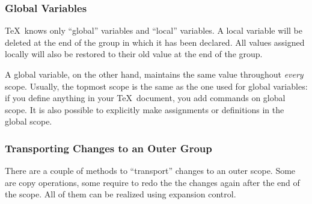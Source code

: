 \subsubsection{Global Variables}
\TeX\ knows only ``global'' variables and ``local'' variables. A local variable will be deleted at the end of the group in which it has been declared. All values assigned locally will also be restored to their old value at the end of the group.

A global variable, on the other hand, maintains the same value throughout \emph{every} scope. Usually, the topmost scope is the same as the one used for global variables: if you define anything in your \TeX\ document, you add commands on global scope. It is also possible to explicitly make assignments or definitions in the global scope.




\subsubsection{Transporting Changes to an Outer Group}
There are a couple of methods to ``transport'' changes to an outer scope. Some are copy operations, some require to redo the the changes again after the end of the scope. All of them can be realized using expansion control.

